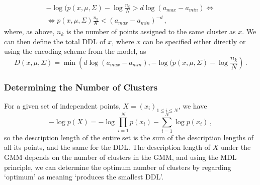 \documentclass[a4paper,fleqn]{cas-sc}
\theoremstyle{remark}
\begin{document}
\begin{gather}
   -\log(p(x, \mu, \Sigma) - \log \frac{n_k}{N} > d \log (a_{max}-a_{min}) \iff \\
    \iff p(x, \mu, \Sigma)\frac{n_k}{K} < (a_{max}-a_{min})^{-d} \,,
\end{gather}
where, as above, $n_k$ is the number of points assigned to the same cluster as $x$. We  can then define the total DDL of $x$, where $x$ can be specified either directly or using the encoding scheme from the model, as 
\begin{equation} \label{eq:d-definition}
    D(x, \mu, \Sigma) = \min \left(d \log (a_{max}-a_{min}), -\log(p(x, \mu, \Sigma) - \log \frac{n_k}{N} \right)\,.
\end{equation}

\subsubsection{Determining the Number of Clusters} \label{subsec:determining-num-clusters}
For a given set of independent points, $X=(x_i)_{1 \leq i \leq N}$, we have
\begin{equation}
    -\log{p(X)} = -\log{\prod_{i=1}^N p(x_i)} -\sum_{i=1}^N \log{p(x_i)} \,,   
\end{equation}
so the description length of the entire set is the sum of the description lengths of all its points, and the same for the DDL.
The description length of $X$ under the GMM depends on the number of clusters in the GMM, and using the MDL principle, we can determine the optimum number of clusters by regarding `optimum' as meaning `produces the smallest DDL'. 
\end{document}
